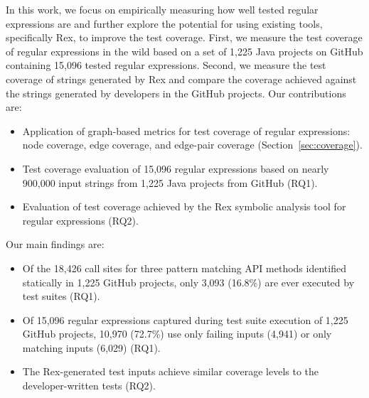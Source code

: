In this work, we focus on empirically measuring how well tested regular expressions are and further explore the potential for using existing tools, specifically Rex, to improve the test coverage. 
First, we measure the test coverage of regular expressions in the wild based on a set of 1,225 Java projects on GitHub containing 15,096 tested regular expressions. Second, we measure the test coverage of strings generated by Rex and compare the coverage achieved against the strings generated by developers in the GitHub projects. %
Our contributions are:
\vspace{-3pt}
\begin{itemize} 
\item Application of graph-based metrics for test coverage of regular expressions: node coverage, edge coverage, and edge-pair coverage (Section~\ref{sec:coverage}).
\item Test coverage evaluation of 15,096 regular expressions based on nearly 900,000 input strings from 1,225 Java projects from GitHub (RQ1).
\item Evaluation of test coverage achieved by the Rex symbolic analysis tool for regular expressions (RQ2).
\end{itemize}
\vspace{-3pt}
Our main findings are:
\vspace{-3pt}
\begin{itemize}
\item Of the 18,426 call sites for three pattern matching API methods identified statically in 1,225 GitHub projects, only 3,093 (16.8\%) are ever executed by test suites (RQ1).
\item Of 15,096 regular expressions captured during test suite execution of 1,225 GitHub projects, 10,970 (72.7\%) use only failing inputs (4,941) or only matching inputs (6,029) (RQ1). 
\item The Rex-generated test inputs achieve similar coverage levels to the developer-written tests (RQ2). 
\end{itemize}

